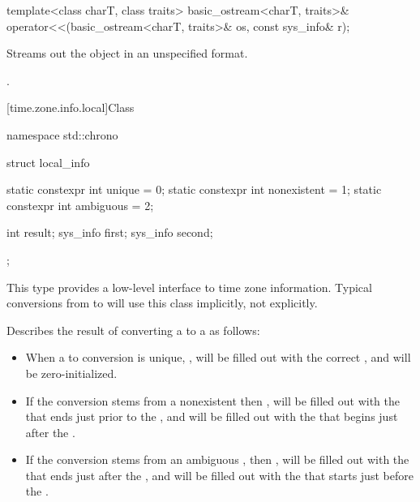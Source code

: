 \begin{itemdecl}
template<class charT, class traits>
  basic_ostream<charT, traits>&
    operator<<(basic_ostream<charT, traits>& os, const sys_info& r);
\end{itemdecl}

\begin{itemdescr}
\pnum
\effects
Streams out the  object  in an unspecified format.

\pnum
\returns
{}.
\end{itemdescr}

[time.zone.info.local]{Class }

%
%
%
%
%
%
\begin{codeblock}
namespace std::chrono {
  struct local_info {
    static constexpr int unique      = 0;
    static constexpr int nonexistent = 1;
    static constexpr int ambiguous   = 2;

    int result;
    sys_info first;
    sys_info second;
  };
}
\end{codeblock}

\pnum
\begin{note}
This type provides a low-level interface to time zone information.
Typical conversions from  to 
will use this class implicitly, not explicitly.
\end{note}

\pnum
Describes the result of converting a  to a 
as follows:
\begin{itemize}
\item
When a  to  conversion is unique,
,
 will be filled out with the correct ,
and
 will be zero-initialized.

\item
If the conversion stems from a nonexistent 
then ,
 will be filled out with the 
that ends just prior to the ,
and
 will be filled out with the 
that begins just after the .

\item
If the conversion stems from an ambiguous ,
then ,
 will be filled out with the 
that ends just after the ,
and
 will be filled out with the 
that starts just before the .
\end{itemize}


